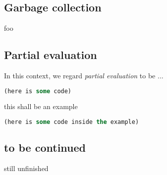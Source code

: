 \documentclass[main.tex]{subfiles}
\begin{document}
\subsection{Garbage collection}
foo

\subsection{Partial evaluation}

In this context, we regard \emph{partial evaluation} to be ...

\begin{lstwrap}\begin{lstlisting}[language=lisp]
(here is some code)
\end{lstlisting}\end{lstwrap}

\begin{mexample}
    this shall be an example
    \begin{lstwrap}\begin{lstlisting}[language=lisp]
    (here is some code inside the example)
    \end{lstlisting}\end{lstwrap}
\end{mexample}

\subsection{to be continued}
still unfinished \pika
\end{document}
